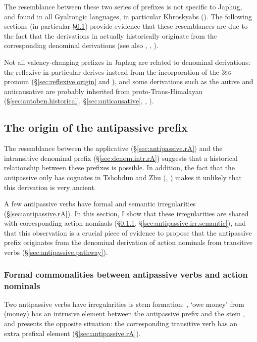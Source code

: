 The resemblance between these two series of prefixes is not specific to Japhug, and found in all Gyalrongic languages, in particular Khroskyabs (\citealt[527]{lai17khroskyabs}). The following sections (in particular §\ref{sec:antipassive.history}) provide evidence that these resemblances are due to the fact that the derivations in  actually historically originate from the corresponding denominal derivations (see also \citealt{jacques14antipassive, jacques15causative}, \citealt[527--529]{lai17khroskyabs}, \citealt{lai20denom}).

Not all valency-changing prefixes in Japhug are related to denominal derivations: the reflexive  in particular derives instead from the incorporation of the \textsc{3sg} pronoun (§\ref{sec:reflexive.origin} and \citealt{jacques10refl}), and some derivations such as the autive and anticausative are probably inherited from proto-Trans-Himalayan  (§\ref{sec:autoben.historical}, §\ref{sec:anticausative}, \citealt{sagart12sprefix}, \citealt{jacques15spontaneous}).

\subsection{The origin of the  antipassive prefix} \label{sec:antipassive.history} 
The resemblance between the  applicative (§\ref{sec:antipassive.rA}) and the intransitive denominal  prefix (§\ref{sec:denom.intr.rA}) suggests that a historical relationship between these prefixes is possible. In addition, the fact that the antipassive only has cognates in Tshobdun and Zbu (\citealt{jackson06paisheng, jackson14morpho}, \citealt{jacques20antipass}) makes it unlikely that this derivation is very ancient.

A few antipassive verbs have formal and semantic irregularities (§\ref{sec:antipassive.rA}). In this section, I show that these irregularities are shared with corresponding action nominals (§\ref{sec:antipassive.irr.form}, §\ref{sec:antipassive.irr.semantic}), and that this observation is a crucial piece of evidence to propose that the antipassive prefix originates from the denominal derivation of action nominals from transitive verbs (§\ref{sec:antipassive.pathway}).

 
\subsubsection{Formal commonalities between antipassive verbs and action nominals} \label{sec:antipassive.irr.form} 
Two antipassive verbs have irregularities is stem formation: , `owe money'  from  (money) has an intrusive  element between the antipassive  prefix and the stem , and  presents the opposite situation: the corresponding transitive verb  has an extra prefixal  element (§\ref{sec:antipassive.rA}).

